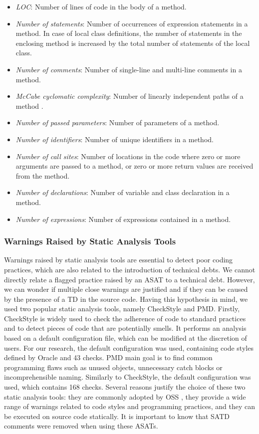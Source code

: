\begin{itemize}
\item \textit{LOC}: Number of lines of code in the body of a method. %
\item \textit{Number of statements}: Number of occurrences of expression statements in a method. In case of local class definitions, the number of statements in the enclosing method is increased by the total number of statements of the local class.
\item \textit{Number of comments}: Number of single-line and multi-line comments in a method.
\item \textit{McCabe cyclomatic complexity}: Number of linearly independent paths of a method \citep{mccabe90}.
\item \textit{Number of passed parameters}: Number of parameters of a method.
\item \textit{Number of identifiers}: Number of unique identifiers in a method.
\item \textit{Number of call sites}: Number of locations in the code where zero or more arguments are passed to a method, or zero or more return values are received from the method.
\item \textit{Number of declarations}: Number of variable and class declaration in a method.
\item \textit{Number of expressions}: Number of expressions contained in a method.
\end{itemize}

\subsubsection{Warnings Raised by Static Analysis Tools}

Warnings raised by static analysis tools are essential to detect poor coding practices, which are also related to the introduction of technical debts. We cannot directly relate a flagged practice raised by an ASAT to a technical debt. However, we can wonder if multiple close warnings are justified and if they can be caused by the presence of a \ac{TD} in the source code. Having this hypothesis in mind, we used two popular static analysis tools, namely CheckStyle and PMD. Firstly, CheckStyle \citep{checkstyle} is widely used to check the adherence of code to standard practices and to detect pieces of code that are potentially smells. It performs an analysis based on a default configuration file, which can be modified at the discretion of users. For our research, the default configuration was used, containing code styles defined by Oracle and 43 checks. PMD \citep{pmd} main goal is to find common programming flaws such as unused objects, unnecessary catch blocks or incomprehensible naming. Similarly to CheckStyle, the default configuration was used, which contains 168 checks. Several reasons justify the choice of these two static analysis tools: they are commonly adopted by \ac{OSS} \citep{BellerBMZ16}, they provide a wide range of warnings related to code styles and programming practices, and they can be executed on source code statically. It is important to know that \ac{SATD} comments were removed when using these ASATs.

